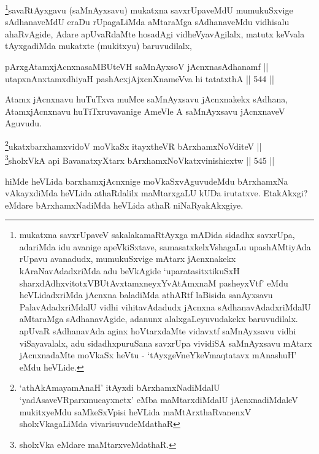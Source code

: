 \begin{artha}
\footnote{mukatxna savxrUpaveV sakalakamaRtAyxga mADida sidadhx
savxrUpa, adariMda idu avanige apeVkiSxtave, samasatxkelxVshagaLu
upashAMtiyAda rUpavu avanadudx, mumukuSxvige mAtarx jAcnxnakekx
kAraNavAdadxriMda adu beVkAgide `uparatasitxtikuSxH sharxdAdhxvitotxVBUtAvx\s \s tamxneyxYvA\s \s tAmxnaM pasheyxVtf' eMdu heVLidadxriMda jAcnxna
baladiMda athARtf laBisida sanAyxsavu PalavAdadxriMdalU vidhi
vihitavAdadudx jAcnxna sAdhanavAdadxriMdalU aMtaraMga sAdhanavAgide,
adanunx alalxgaLeyuvudakekx baruvudilalx. apUvaR sAdhanavAda
aginx hoVtarxdaMte vidavxtf saMnAyxsavu vidhi viSayavalalx, adu
sidadhxpuruSana savxrUpa vividiSA saMnAyxsavu mAtarx jAcnxnadaMte
moVkaSx heVtu - `tAyxgeVneYkeV\s maqtatavx mAnashuH' eMdu heVLide.}savaRtAyxgavu (saMnAyxsavu) mukatxna savxrUpaveMdU
mumukuSxvige sAdhanaveMdU eraDu rUpagaLiMda aMtaraMga sAdhanaveMdu
vidhisalu ahaRvAgide, Adare apUvaRdaMte hosadAgi vidheVyavAgilalx,
matutx keVvala tAyxgadiMda mukatxte (mukitxyu) baruvudilalx, 
\end{artha}

\begin{shl}
pArxgAtamxjAcnxnasaMBUteVH saMnAyxsoV jAcnxnasAdhanamf || \\
utapxnAnxtamxdhiyaH pashAcxjAjxcnXnameVva hi tatatxthA \hfill || 544 ||  
\end{shl}

\begin{artha}
Atamx jAcnxnavu huTuTxva muMce saMnAyxsavu jAcnxnakekx sAdhana,
AtamxjAcnxnavu huTiTxruvavanige AmeVle A saMnAyxsavu jAcnxnaveV
Aguvudu.
\end{artha}


\begin{shl}
\footnote{`athAkAmayamAnaH' itAyxdi bArxhamxNadiMdalU `yadAsaveVRparxmucayxnetx' eMba
maMtarxdiMdalU jAcnxnadiMdaleV mukitxyeMdu saMkeSxVpisi heVLida maMtArxthaRvanenxV sholxVkagaLiMda vivarisuvudeMdathaR}ukatxbarxhamxvidoV moVkaSx itayxtheVR bArxhamxNoVditeV || \\
\footnote{sholxVka eMdare maMtarxveMdathaR.}sholxVkA api BavanatxyXtarx bArxhamxNoVkatxvinishicxtw \hfill || 545 ||  
\end{shl}


\begin{artha}
hiMde heVLida barxhamxjAcnxnige moVkaSxvAguvudeMdu
bArxhamxNa vAkayxdiMda heVLida athaRdalilx maMtarxgaLU kUDa
irutatxve. EtakAkxgi? eMdare bArxhamxNadiMda heVLida athaR
niNaRyakAkxgiye.
\end{artha}

